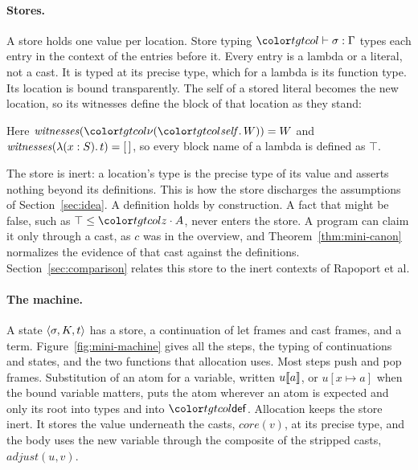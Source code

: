 \paragraph{Stores.}
A store holds one value per location. Store typing $\storej{\sigma}{\Gamma}$ types each entry in the context of the entries before it. Every entry is a lambda or a literal, not a cast. It is typed at its precise type, which for a lambda is its function type. Its location is bound transparently. The self of a stored literal becomes the new location, so its witnesses define the block of that location as they stand:
Here $\mathit{witnesses}(\tgt{\nu(\self.\,W)}) = W$ and $\mathit{witnesses}(\lambda(x : S).\,t) = [\,]$, so every block name of a lambda is defined as $\top$.

The store is inert: a location's type is the precise type of its value and asserts nothing beyond its definitions. This is how the store discharges the assumptions of Section~\ref{sec:idea}. A definition holds by construction. A fact that might be false, such as $\top \le \sel{z}{A}$, never enters the store. A program can claim it only through a cast, as $c$ was in the overview, and Theorem~\ref{thm:mini-canon} normalizes the evidence of that cast against the definitions. Section~\ref{sec:comparison} relates this store to the inert contexts of Rapoport et al.

\paragraph{The machine.}
A state $\langle \sigma, K, t\rangle$ has a store, a continuation of let frames and cast frames, and a term. Figure~\ref{fig:mini-machine} gives all the steps, the typing of continuations and states, and the two functions that allocation uses. Most steps push and pop frames. Substitution of an atom for a variable, written $u\llbracket a\rrbracket$, or $u[x \mapsto a]$ when the bound variable matters, puts the atom wherever an atom is expected and only its root into types and into $\ev{def}$. Allocation keeps the store inert. It stores the value underneath the casts, $\mathit{core}(v)$, at its precise type, and the body uses the new variable through the composite of the stripped casts, $\mathit{adjust}(u, v)$.

